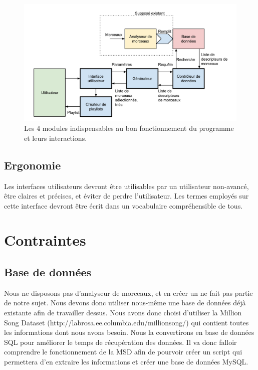 \begin{figure}[H]
\includegraphics[width=\textwidth]{data/besoins/modules.png}
\caption{Les 4 modules indispensables au bon fonctionnement du programme et leurs
interactions.}
\end{figure}

\subsection{Ergonomie}
\label{besoins:nfonc:perf:erg}
Les interfaces utilisateurs devront être utilisables par un utilisateur
non-avancé, être claires et précises, et éviter de perdre l’utilisateur. Les
termes employés sur cette interface devront être écrit dans un vocabulaire
compréhensible de tous.

\section{Contraintes}
\label{besoins:contraintes}

\subsection{Base de données}
\label{besoins:contraintes:bdd}
Nous ne disposons pas d’analyseur de morceaux, et en créer un ne fait pas partie
de notre sujet. Nous devons donc utiliser nous-même une base de données déjà
existante afin de travailler dessus. Nous avons donc choisi d’utiliser la Million
Song Dataset (http://labrosa.ee.columbia.edu/millionsong/) qui contient toutes
les informations dont nous avons besoin. Nous la convertirons en base de données
SQL pour améliorer le temps de récupération des données. Il va donc falloir comprendre
le fonctionnement de la MSD afin de pourvoir créer un script qui permettera d'en extraire 
les informations et créer une base de données MySQL.
    
